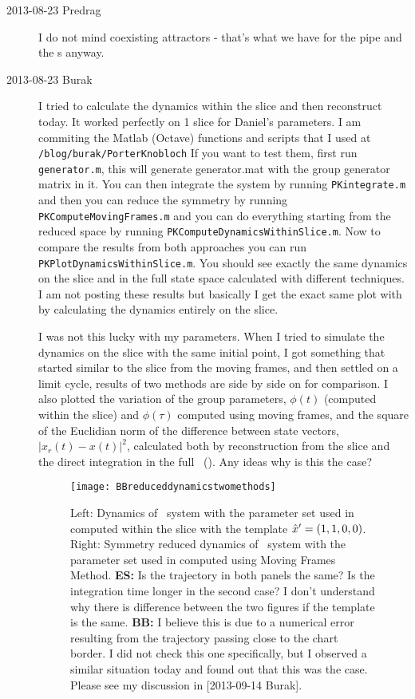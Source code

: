 \begin{description}
\item[2013-08-23 Predrag] I do not mind coexisting attractors - that's what we have
for the pipe and the \pCf s anyway.

\item[2013-08-23 Burak] I tried to calculate the dynamics within the slice and then reconstruct today. It worked perfectly on 1 slice for Daniel's parameters. I am commiting the Matlab (Octave) functions and scripts that I used at
\texttt{/blog/burak/PorterKnobloch}
If you want to test them, first run \texttt{generator.m}, this will generate generator.mat with the group generator matrix in it. You can then integrate the system by running \texttt{PKintegrate.m} and then you can reduce the symmetry by running \texttt{PKComputeMovingFrames.m} and you can do everything starting from the reduced space by running \texttt{PKComputeDynamicsWithinSlice.m}. Now to compare the results from both approaches you can run \texttt{PKPlotDynamicsWithinSlice.m}. You should see exactly the same dynamics on the slice and in the full state space calculated with different techniques. I am not posting these results but basically I get the exact same plot with  by calculating the dynamics entirely on the slice.

I was not this lucky with my parameters. When I tried to simulate the dynamics on the slice with the same initial point, I got something that started similar to the slice from the moving frames, and then settled on a limit cycle, results of two methods are side by side on  for comparison. I also plotted the variation of the group parameters, $\phi(t)$ (computed within the slice) and $\phi(\tau)$ computed using moving frames, and the square of the Euclidian norm of the difference between state vectors, $|x_r(t)-x(t)|^2$, calculated both by reconstruction from the slice and the direct integration in the full \statesp\ (). Any ideas why is this the case?

\begin{figure}%
  \begin{center}
  \texttt{[image: BBreduceddynamicstwomethods]}
  \end{center}
  \caption{Left: Dynamics of \twoMode\ system with the parameter set used
    in  computed within the slice with
    the template ${\hat{x}'} = (1,1,0,0)$. Right: Symmetry reduced dynamics
    of \twoMode\ system with the parameter set
    used in 
    computed using Moving Frames Method. \textbf{ES:} Is the trajectory
    in both panels the same? Is the integration time longer in the second case?
    I don't understand why there is difference between the two figures if the
    template is the same. \textbf{BB:} I believe this is due to a numerical error resulting from the trajectory passing close to the chart border. I did not check this one specifically, but I observed a similar situation today and found out that this was the case. Please see my discussion in [2013-09-14 Burak].
     }
  \label{fig:BBreduceddynamicstwomethods}
\end{figure}


\end{description}
